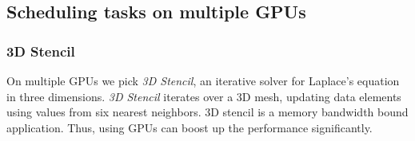 %
\subsection{Scheduling tasks on multiple GPUs}
\subsubsection{3D Stencil}
\label{subsec:3DStencil_1node}
On multiple GPUs we pick {\em 3D Stencil}, an iterative solver for Laplace's equation in three dimensions.
{\em 3D Stencil} iterates over a 3D mesh, updating data elements using values from six nearest neighbors.
3D stencil is a memory bandwidth bound application. 
Thus, using GPUs can boost up the performance significantly.


